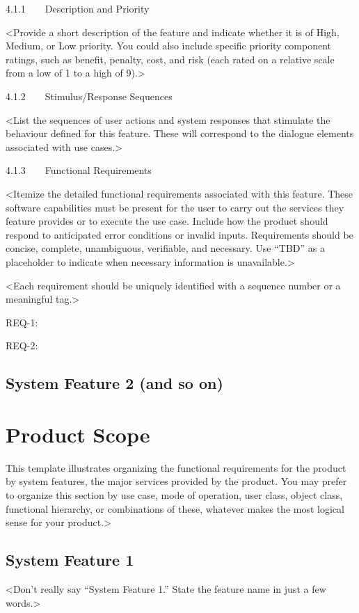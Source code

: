 \documentclass{scrreprt}
\begin{document}
4.1.1    Description and Priority

<Provide a short description of the feature and indicate whether it is of High, Medium, or Low priority. You could also include specific priority component ratings, such as benefit, penalty, cost, and risk (each rated on a relative scale from a low of 1 to a high of 9).>

4.1.2    Stimulus/Response Sequences

<List the sequences of user actions and system responses that stimulate the behaviour defined for this feature. These will correspond to the dialogue elements associated with use cases.>

4.1.3    Functional Requirements

<Itemize the detailed functional requirements associated with this feature. These software capabilities must be present for the user to carry out the services they feature provides or to execute the use case. Include how the product should respond to anticipated error conditions or invalid inputs. Requirements should be concise, complete, unambiguous, verifiable, and necessary. Use “TBD” as a placeholder to indicate when necessary information is unavailable.>

<Each requirement should be uniquely identified with a sequence number or a meaningful tag.>

REQ-1:

REQ-2:

\subsection*{System Feature 2 (and so on)}
    \section{Product Scope}
    This template illustrates organizing the functional requirements for the product by system features, the major services provided by the product. You may prefer to organize this section by use case, mode of operation, user class, object class, functional hierarchy, or combinations of these, whatever makes the most logical sense for your product.>

\subsection*{System Feature 1}

<Don’t really say “System Feature 1.” State the feature name in just a few words.>
\end{document}
